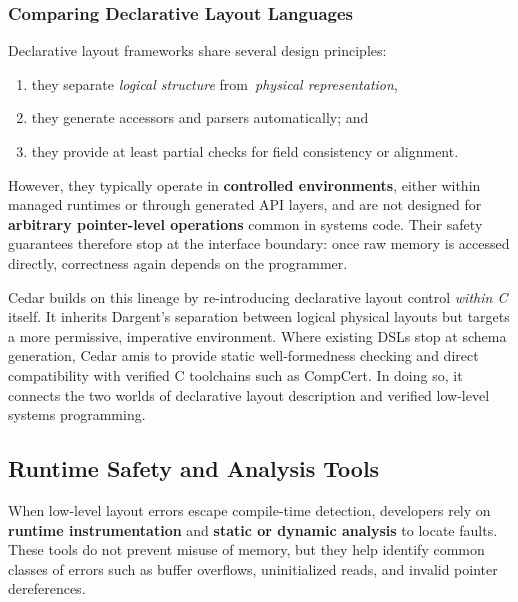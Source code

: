 \subsubsection{Comparing Declarative Layout Languages}
Declarative layout frameworks share several design principles:
\begin{enumerate}
    \item they separate \textit{logical structure} from\
    \textit{physical representation},
    \item they generate accessors and parsers automatically; and
    \item they provide at least partial checks for field consistency or
    alignment.
\end{enumerate}

However, they typically operate in \textbf{controlled environments}, either
within managed runtimes or through generated API layers, and are not designed
for \textbf{arbitrary pointer-level operations} common in systems code.
Their safety guarantees therefore stop at the interface boundary: once raw
memory is accessed directly, correctness again depends on the programmer.


Cedar builds on this lineage by re-introducing declarative layout control
\textit{within C} itself. It inherits Dargent's separation between logical
physical layouts but targets a more permissive,
imperative environment. Where existing DSLs stop at schema generation,
Cedar amis to provide static well-formedness checking and direct compatibility
with verified C toolchains such as CompCert. In doing so, it connects the
two worlds of declarative layout description and
verified low-level systems programming. 


\subsection{Runtime Safety and Analysis Tools}
When low-level layout errors escape compile-time detection, developers rely on
\textbf{runtime instrumentation} and \textbf{static or dynamic analysis} to
locate faults.
These tools do not prevent misuse of memory, but they help identify common
classes of errors such as buffer overflows, uninitialized reads, and invalid
pointer dereferences.

